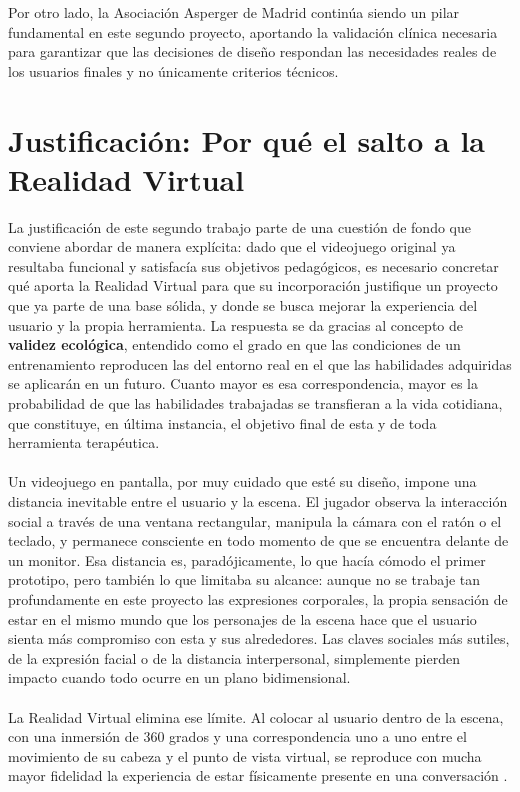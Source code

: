 \documentclass[12pt,twoside,titlepage]{report}
\begin{document}
Por otro lado, la Asociación Asperger de Madrid continúa siendo un pilar fundamental en este segundo proyecto, aportando la validación clínica necesaria para garantizar que las decisiones de diseño respondan las necesidades reales de los usuarios finales y no únicamente criterios técnicos.

\section{Justificación: Por qué el salto a la Realidad Virtual}

La justificación de este segundo trabajo parte de una cuestión de fondo que conviene abordar de manera explícita: dado que el videojuego original ya resultaba funcional y satisfacía sus objetivos pedagógicos, es necesario concretar qué aporta la Realidad Virtual para que su incorporación justifique un proyecto que ya parte de una base sólida, y donde se busca mejorar la experiencia del usuario y la propia herramienta.
La respuesta se da gracias al concepto de \textbf{validez ecológica}, entendido como el grado en que las condiciones de un entrenamiento reproducen las del entorno real en el que las habilidades adquiridas se aplicarán en un futuro.
Cuanto mayor es esa correspondencia, mayor es la probabilidad de que las habilidades trabajadas se transfieran a la vida cotidiana, que constituye, en última instancia, el objetivo final de esta y de toda herramienta terapéutica.\\
\\
Un videojuego en pantalla, por muy cuidado que esté su diseño, impone una distancia inevitable entre el usuario y la escena.
El jugador observa la interacción social a través de una ventana rectangular, manipula la cámara con el ratón o el teclado, y permanece consciente en todo momento de que se encuentra delante de un monitor.
Esa distancia es, paradójicamente, lo que hacía cómodo el primer prototipo, pero también lo que limitaba su alcance: aunque no se trabaje tan profundamente en este proyecto las expresiones corporales, la propia sensación de estar en el mismo mundo que los personajes de la escena hace que el usuario sienta más compromiso con esta y sus alrededores. Las claves sociales más sutiles, de la expresión facial o de la distancia interpersonal, simplemente pierden impacto cuando todo ocurre en un plano bidimensional.\\
\\
La Realidad Virtual elimina ese límite.
Al colocar al usuario dentro de la escena, con una inmersión de 360 grados y una correspondencia uno a uno entre el movimiento de su cabeza y el punto de vista virtual, se reproduce con mucha mayor fidelidad la experiencia de estar físicamente presente en una conversación \parencite{slater2009}.
\end{document}
